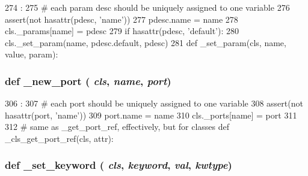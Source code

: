 \begin{DoxyCode}
274                                     :
275         # each param desc should be uniquely assigned to one variable
276         assert(not hasattr(pdesc, 'name'))
277         pdesc.name = name
278         cls._params[name] = pdesc
279         if hasattr(pdesc, 'default'):
280             cls._set_param(name, pdesc.default, pdesc)
281 
    def _set_param(cls, name, value, param):
\end{DoxyCode}
\hypertarget{classm5_1_1SimObject_1_1MetaSimObject_a6490df0f3d3befd9c38994fa46520f70}{
\subsubsection[{\_\-new\_\-port}]{\setlength{\rightskip}{0pt plus 5cm}def \_\-new\_\-port ( {\em cls}, \/   {\em name}, \/   {\em port})}}
\label{classm5_1_1SimObject_1_1MetaSimObject_a6490df0f3d3befd9c38994fa46520f70}



\begin{DoxyCode}
306                                   :
307         # each port should be uniquely assigned to one variable
308         assert(not hasattr(port, 'name'))
309         port.name = name
310         cls._ports[name] = port
311 
312     # same as _get_port_ref, effectively, but for classes
    def _cls_get_port_ref(cls, attr):
\end{DoxyCode}
\hypertarget{classm5_1_1SimObject_1_1MetaSimObject_a5abb9e05651c6ebea8a449d8b9f631da}{
\subsubsection[{\_\-set\_\-keyword}]{\setlength{\rightskip}{0pt plus 5cm}def \_\-set\_\-keyword ( {\em cls}, \/   {\em keyword}, \/   {\em val}, \/   {\em kwtype})}}
\label{classm5_1_1SimObject_1_1MetaSimObject_a5abb9e05651c6ebea8a449d8b9f631da}




